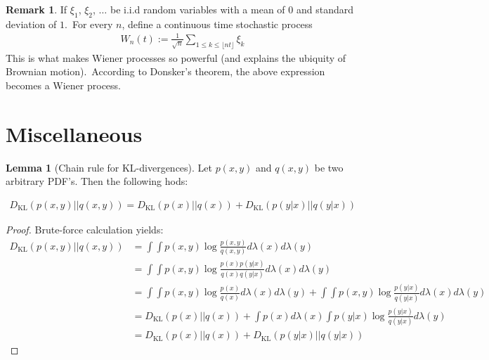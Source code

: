 \documentclass[12pt, a4paper]{article}
\numberwithin{equation}{section}
\theoremstyle{definition}
\theoremstyle{definition}
\newtheorem{lemma}[thm]{Lemma} %
\newtheorem{remark}[thm]{Remark} %
\begin{document}
\begin{remark}
	If $\xi_{1}$, $\xi_{2}$, $\dots$ be i.i.d random variables with a mean of $0$ and standard deviation of $1$.\ For every $n$, define a continuous time stochastic process 
	\begin{align}\label{random_walk_Wiener}
		W_{n}(t) := \frac{1}{\sqrt{n}}\sum_{1\leq k\leq\lfloor nt \rfloor}\xi_{k} 
	\end{align}
	This is what makes Wiener processes so powerful (and explains the ubiquity of Brownian motion).\ According to Donsker's theorem, the  above expression becomes a Wiener process.
\end{remark}

\newpage 

\section{Miscellaneous}

	\begin{lemma}[Chain rule for KL-divergences]
		Let $p(x, y)$ and $q(x, y)$ be two arbitrary PDF's. Then the following hods:
		
		\begin{align}
			D_{\text{KL}}(p(x, y) \vert\vert q(x, y)) = D_{\text{KL}}(p(x)\vert\vert q(x)) + D_{\text{KL}}(p(y\vert x) \vert\vert q(y\vert x))
		\end{align}
		
		\begin{proof}
			Brute-force calculation yields:
			\begin{align}
				D_{\text{KL}}(p(x, y) \vert\vert q(x, y)) &= \int\int p(x, y)\log\frac{p(x, y)}{q(x, y)}d\lambda(x)d\lambda(y)
				\\[4pt] &= \int\int p(x, y)\log\frac{p(x)p(y\vert x)}{q(x)q(y\vert x)}d\lambda(x)d\lambda(y)
				\\[4pt] &= \int\int p(x, y)\log\frac{p(x)}{q(x)}d\lambda(x)d\lambda(y) + \int\int p(x, y)\log\frac{p(y\vert x)}{q(y\vert x)}d\lambda(x)d\lambda(y)
				\\[4pt] &= D_{\text{KL}}(p(x) \vert\vert q(x)) + \int p(x)d\lambda(x)\int p(y\vert x)\log\frac{p(y\vert x)}{q(y\vert x)}d\lambda(y)
				\\[4pt] &= D_{\text{KL}}(p(x) \vert\vert q(x)) + D_{\text{KL}}(p(y\vert x) \vert\vert q(y\vert x))
			\end{align}
		\end{proof}
	\end{lemma}
	
\end{document}
